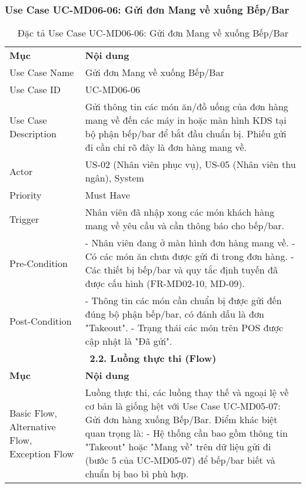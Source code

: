 \subsubsection{Use Case UC-MD06-06: Gửi đơn Mang về xuống Bếp/Bar}

\begin{longtable}{|m{4cm}|p{11cm}|}
\caption{Đặc tả Use Case UC-MD06-06: Gửi đơn Mang về xuống Bếp/Bar} \label{tab:uc_md06_06} \\
\hline

\endhead %
\hline
\endfoot %
\hline
\endlastfoot %
\multicolumn{2}{|c|}{\textbf{2.1. Tóm tắt (Summary)}} \\
\hline
\textbf{Mục} & \textbf{Nội dung} \\
\hline
Use Case Name & Gửi đơn Mang về xuống Bếp/Bar \\
\hline
Use Case ID & UC-MD06-06 \\
\hline
Use Case Description & Gửi thông tin các món ăn/đồ uống của đơn hàng mang về đến các máy in hoặc màn hình KDS tại bộ phận bếp/bar để bắt đầu chuẩn bị. Phiếu gửi đi cần chỉ rõ đây là đơn hàng mang về. \\
\hline
Actor & US-02 (Nhân viên phục vụ), US-05 (Nhân viên thu ngân), System \\
\hline
Priority & Must Have \\
\hline
Trigger & Nhân viên đã nhập xong các món khách hàng mang về yêu cầu và cần thông báo cho bếp/bar. \\
\hline
Pre-Condition & - Nhân viên đang ở màn hình đơn hàng mang về. \newline - Có các món ăn chưa được gửi đi trong đơn hàng. \newline - Các thiết bị bếp/bar và quy tắc định tuyến đã được cấu hình (FR-MD02-10, MD-09). \\
\hline
Post-Condition & - Thông tin các món cần chuẩn bị được gửi đến đúng bộ phận bếp/bar, có đánh dấu là đơn "Takeout". \newline - Trạng thái các món trên POS được cập nhật là "Đã gửi". \\
\hline
\multicolumn{2}{|c|}{\textbf{2.2. Luồng thực thi (Flow)}} \\
\hline
\textbf{Mục} & \textbf{Nội dung} \\
\hline
Basic Flow, Alternative Flow, Exception Flow & Luồng thực thi, các luồng thay thế và ngoại lệ về cơ bản là giống hệt với Use Case UC-MD05-07: Gửi đơn hàng xuống Bếp/Bar. Điểm khác biệt quan trọng là: \newline - Hệ thống cần bao gồm thông tin "Takeout" hoặc "Mang về" trên dữ liệu gửi đi (bước 5 của UC-MD05-07) để bếp/bar biết và chuẩn bị bao bì phù hợp. \\

\end{longtable}
